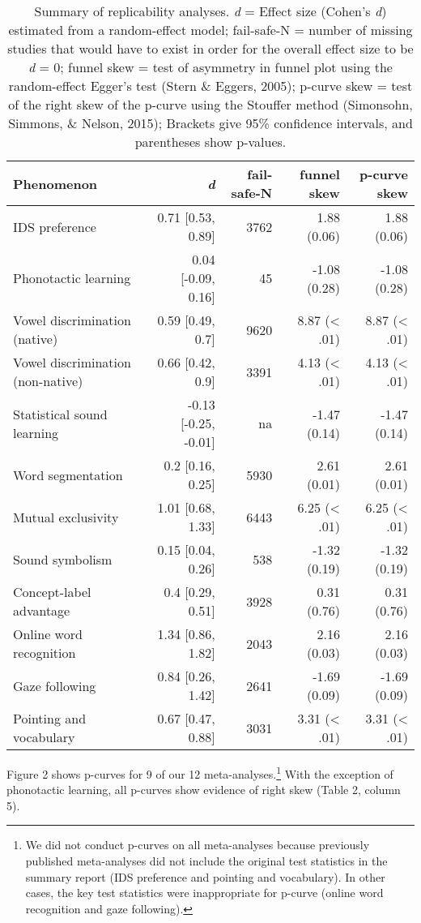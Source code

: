 \documentclass[english,floatsintext,man]{apa6}
\begin{document}
\begin{table}[t]
\footnotesize
\begin{tabular}{lrrrr}
\toprule
\textbf{Phenomenon} & \textbf{\textit{d}} & \textbf{fail-safe-N} & \textbf{funnel skew} & \textbf{p-curve skew}\\
\midrule

IDS preference & 0.71 [0.53, 0.89] & 3762 & 1.88 (0.06) & 1.88 (0.06)\\
Phonotactic learning & 0.04 [-0.09, 0.16] & 45 & -1.08 (0.28) & -1.08 (0.28)\\
Vowel discrimination (native) & 0.59 [0.49, 0.7] & 9620 & 8.87 (< .01) & 8.87 (< .01)\\
Vowel discrimination (non-native) & 0.66 [0.42, 0.9] & 3391 & 4.13 (< .01) & 4.13 (< .01)\\
Statistical sound learning & -0.13 [-0.25, -0.01] & na & -1.47 (0.14) & -1.47 (0.14)\\
Word segmentation & 0.2 [0.16, 0.25] & 5930 & 2.61 (0.01) & 2.61 (0.01)\\
Mutual exclusivity & 1.01 [0.68, 1.33] & 6443 & 6.25 (< .01) & 6.25 (< .01)\\
Sound symbolism & 0.15 [0.04, 0.26] & 538 & -1.32 (0.19) & -1.32 (0.19)\\
Concept-label advantage & 0.4 [0.29, 0.51] & 3928 & 0.31 (0.76) & 0.31 (0.76)\\
Online word recognition & 1.34 [0.86, 1.82] & 2043 & 2.16 (0.03) & 2.16 (0.03)\\
Gaze following & 0.84 [0.26, 1.42] & 2641 & -1.69 (0.09) & -1.69 (0.09)\\
Pointing and vocabulary & 0.67 [0.47, 0.88] & 3031 & 3.31 (< .01) & 3.31 (< .01)\\


\bottomrule
\end{tabular}
\caption{Summary of replicability analyses. \textit{d} = Effect size (Cohen's {\it d}) estimated from a random-effect model; fail-safe-N = number of missing studies that would have to exist in order for the overall effect size to be {\it d} = 0; funnel skew = test of asymmetry in funnel plot using the random-effect Egger's test (Stern \& Eggers, 2005); p-curve skew = test of the right skew of the p-curve using the Stouffer method (Simonsohn, Simmons, \& Nelson, 2015); Brackets give 95\% confidence intervals, and parentheses show p-values.}
\end{table}

Figure 2 shows p-curves for 9 of our 12
meta-analyses.\footnote{We did not conduct p-curves on all meta-analyses because previously published meta-analyses did not include the original test statistics in the summary report (IDS preference and pointing and vocabulary). In other cases, the key test statistics were inappropriate for p-curve (online word recognition and gaze following).}
With the exception of phonotactic learning, all p-curves show evidence
of right skew (Table 2, column 5).
\end{document}
